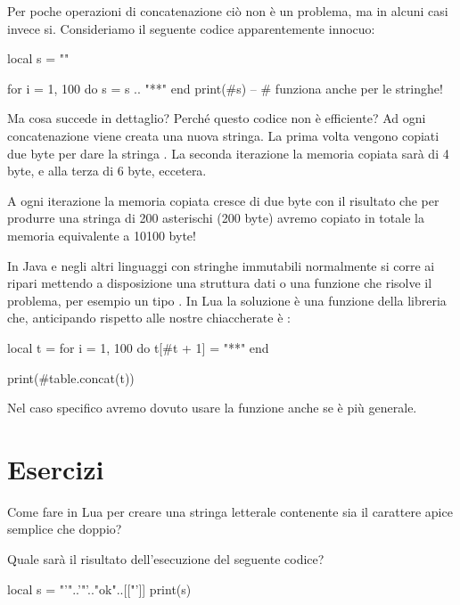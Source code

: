 Per poche operazioni di concatenazione ciò non è un problema, ma in alcuni casi
invece si. Consideriamo il seguente codice apparentemente innocuo:
\begin{lines}
local s = ""

for i = 1, 100 do
    s = s .. "**"
end
print(#s) -- # funziona anche per le stringhe!
\end{lines}

Ma cosa succede in dettaglio? Perché questo codice non è efficiente?
Ad ogni concatenazione viene creata una nuova stringa. La prima volta vengono
copiati due byte per dare la stringa . La seconda iterazione la
memoria copiata sarà di 4 byte, e alla terza di 6 byte, eccetera.

A ogni iterazione la memoria copiata cresce di due byte con il risultato che per
produrre una stringa di 200 asterischi (200 byte) avremo copiato in totale la
memoria equivalente a 10100 byte!

In Java e negli altri linguaggi con stringhe immutabili normalmente si corre ai
ripari mettendo a disposizione una struttura dati o una funzione che risolve il
problema, per esempio un tipo . In Lua la soluzione è una
funzione della libreria  che, anticipando rispetto alle nostre
chiaccherate è :
\begin{lines}
local t = {}
for i = 1, 100 do
    t[#t + 1] = "**"
end

print(#table.concat(t))
\end{lines}

Nel caso specifico avremo dovuto usare la funzione  anche se
 è più generale.


\section{Esercizi}

\begin{Exercise}[label=string-01]
Come fare in Lua per creare una stringa letterale contenente sia il
carattere apice semplice che doppio?
\end{Exercise}

\begin{Exercise}[label=string-02]
Quale sarà il risultato dell'esecuzione del seguente codice?
\begin{lines}
local s = "'"..'"'.."ok"..[["']]
print(s)
\end{lines}
\end{Exercise}

